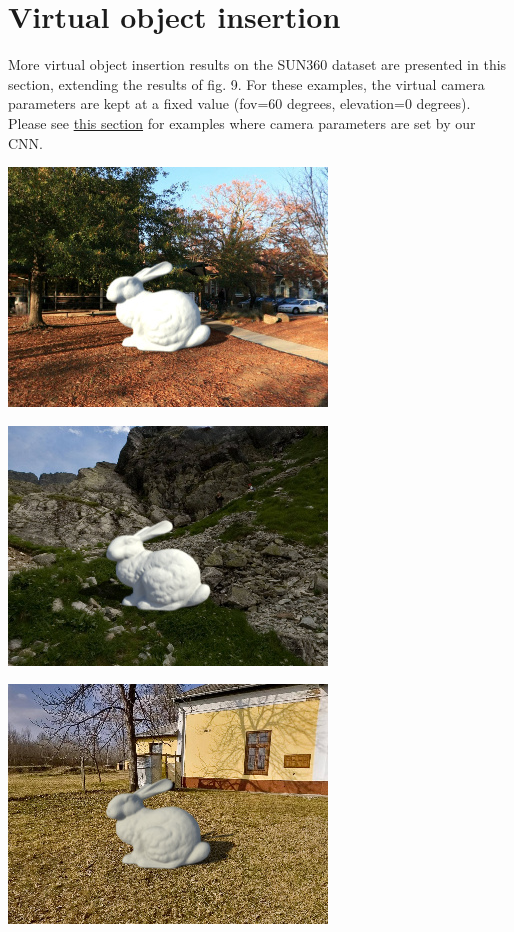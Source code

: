 \protect\hypertarget{virtualobjectinsert}{}{}

\hypertarget{virtual-object-insertion}{%
\section{Virtual object
insertion}\label{virtual-object-insertion}}

More virtual object insertion results on the SUN360 dataset are
presented in this section, extending the results of fig. 9. For these
examples, the virtual camera parameters are kept at a fixed value
(fov=60 degrees, elevation=0 degrees). Please see
\protect\hyperlink{camparaminsertionex}{this section} for examples where
camera parameters are set by our CNN.

\begin{multicols}{3}

\includegraphics[width=\mywidth]{pano_amclvftibwceyr.jpg}

\includegraphics[width=\mywidth]{pano_aoexvqbqucbcuw.jpg}

\includegraphics[width=\mywidth]{pano_apkqohzzaljfyl.jpg}


\end{multicols}
